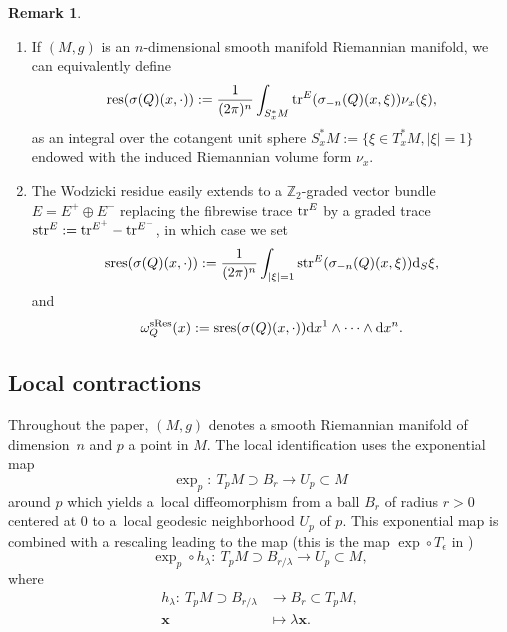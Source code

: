 \documentclass[pdftex]{sigma}
\numberwithin{equation}{section}
\theoremstyle{definition}
\newtheorem{rk}[thm]{Remark}
\newcommand{\Z}{\mathbb Z}
\begin{document}
\begin{rk}\quad
\begin{enumerate}\itemsep=0pt
\item If $(M, g)$ is an $n$-dimensional smooth manifold Riemannian manifold, we can equivalently define
\[
{\rm res}(\sigma(Q)(x,\cdot)):=\frac{1}{(2\pi)^n} \int_{S_x^*M}{\rm tr}^E(\sigma_{-n}(Q) (x, \xi)) \nu_x(\xi),
\]
as an integral over the cotangent unit sphere $S_x^* M:=\{\xi\in T_x^*M, \vert \xi\vert=1\}$ endowed with the induced Riemannian volume form $\nu_x$.
\item The Wodzicki residue easily extends to a $\Z_2$-graded vector bundle $E=E^+\oplus E^-$ replacing the fibrewise trace ${\rm tr}^E$ by a graded trace ${\rm str}^E:= {\rm tr}^{E^+}- {\rm tr}^{E^-}$, in which case we set
\[
{\rm sres}(\sigma(Q)(x,\cdot)):=\frac{1}{(2\pi)^n} \int_{|\xi|=1}{\rm str}^E(\sigma_{-n}(Q) (x, \xi)) {\rm d}_S\xi,
\]
and
\[
\omega_Q^{\rm sRes}(x):= {\rm sres}(\sigma(Q)(x,\cdot)) {\rm d}x^1\wedge\dots \wedge {\rm d}x^n.
\]
\end{enumerate}\end{rk}

\subsection{Local contractions}
Throughout the paper, $(M, g)$ denotes a smooth Riemannian manifold of dimension~$n$ and $p$ a point in $M$. The local identification uses the exponential map
\begin{equation}\label{eq:expp}
\exp_{p}\colon \ T_{p}M\supset B_r\longrightarrow U_{p}\subset M
\end{equation}
around $p$ which yields a~local diffeomorphism from a ball $B_r$ of radius $r>0$ centered at $0$ to a~local geodesic neighborhood $U_p$ of $p$.
This exponential map is combined with a rescaling leading to the map (this is the map $\exp\circ T_\epsilon$ in \cite[formula (4.4.7)]{F})
\begin{equation*}
\exp_{p} \circ h_\lambda\colon \ T_{p}M\supset B_{r/\lambda}\longrightarrow U_{p}\subset M,
\end{equation*}
where
\begin{align*}
h_\lambda\colon \ T_{p} M\supset B_{r/\lambda} &\longrightarrow B_r\subset T_{p}M, \\
	{\mathbf x} & \longmapsto \lambda {\mathbf x}.
\end{align*}
\end{document}
